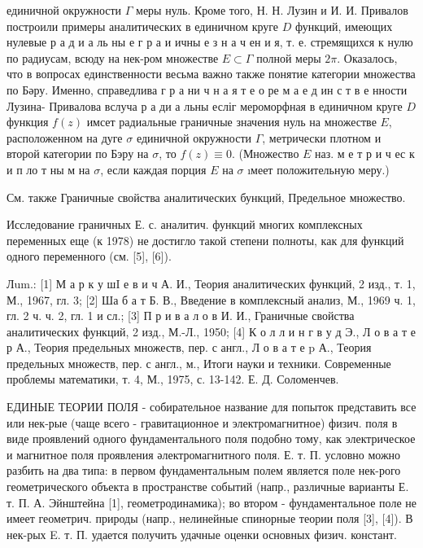 \documentclass[10pt]{article}
\begin{document}
единичной окружности $\Gamma$ меры нуль. Кроме того, Н. Н. Лузин и И. И. Привалов построили примеры аналитических в единичном круге $D$ функций, имеющих нулевые р а д и а ль ны е г р а и ичны е з н а ч ен и я, т. е. стремящихся к нулю по радиусам, всюду на нек-ром множестве $E \subset \Gamma$ полной меры $2 \pi$. Оказалось, что в вопросах единственности весьма важно также понятие категории множества по Бәру. Именно, справедлива г р а ни ч н а я т е о ре м а е д ин с т в е нности Лузина- Привалова вслуча р а ди а льны есліг мероморфная в единичном круге $D$ функция $f(z)$ имсет радиальные граничные значения нуль на множестве $E$, расположенном на дуге $\sigma$ единичной окружности $\Gamma$, метрически плотном и второй категории по Бэру на $\sigma$, то $f(z) \equiv 0$. (Множество $E$ наз. м е т р и ч ес к и п ло т ны м на $\sigma$, если каждая порция $E$ на $\sigma$ ıмеет положительную меру.)



См. также Граничные свойства аналитических бункций, Предельное множество.



Исследование граничных Е. с. аналитич. функций многих комплексных переменных еще (к 1978) не достигло такой степени полноты, как для функций одного переменного (см. [5], [6]).



Лum.: [1] М а р к у шI е в и ч А. И., Теория аналитических функций, 2 изд., т. 1, М., 1967, гл. 3; [2] Ша б а т Б. В., Введение в комплексный анализ, М., 1969 ч. 1, гл. 2 ч. ч. 2, гл. 1 и сл.; [3] П р и в а л о в И. И., Граничные свойства аналитических функций, 2 изд., М.-Л., 1950; [4] К о л л и н г в у д Э., Л о в а т е р А., Теория предельных множеств, пер. с англ., Л о в а т е p А., Теория предельных множеств, пер. с англ., м., Итоги науки и техники. Современные проблемы математики, т. 4, М., 1975, с. 13-142. Е. Д. Соломенчев.



ЕДИНЫЕ ТЕОРИИ ПОЛЯ - собирательное название для попыток представить все или нек-рые (чаще всего - гравитационное и электромагнитное) физич. поля в виде проявлений одного фундаментального поля подобно тому, как электрическое и магнитное поля проявления әлектромагнитного поля. Е. т. П. условно можно разбить на два типа: в первом фундаментальным полем является поле нек-рого геометрического объекта в пространстве событий (напр., различные варианты Е. т. П. А. Эйнштейна [1], геометродинамика); во втором - фундаментальное поле не имеет геометрич. природы (напр., нелинейные спинорные теории поля [3], [4]). В нек-рых E. т. П. удается получить удачные оценки основных физич. констант.
\end{document}
